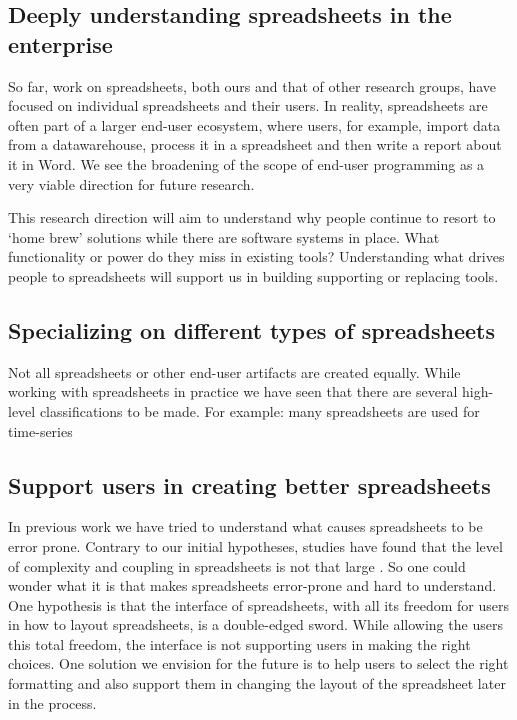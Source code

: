\documentclass[conference]{IEEEtran}
\begin{document}
\subsection{Deeply understanding spreadsheets in the enterprise}
So far, work on spreadsheets, both ours and that of other research groups, have focused on individual spreadsheets and their users. In reality, spreadsheets are often part of a larger end-user ecosystem, where users, for example, import data from a datawarehouse, process it in a spreadsheet and then write a report about it in Word. We see the broadening of the scope of end-user programming as a very viable direction for future research. 

This research direction will aim to understand why people continue to resort to `home brew' solutions while there are software systems in place. What functionality or power do they miss in existing tools? Understanding what drives people to spreadsheets will support us in building supporting or replacing tools.

\subsection{Specializing on different types of spreadsheets}
Not all spreadsheets or other end-user artifacts are created equally. While working with spreadsheets in practice we have seen that there are several high-level classifications to be made. For example: many spreadsheets are used for time-series 

\subsection{Support users in creating better spreadsheets}
In previous work we have tried to understand what causes spreadsheets to be error prone. Contrary to our initial hypotheses, studies have found that the level of complexity and coupling in spreadsheets is not that large . So one could wonder what it is that makes spreadsheets error-prone and hard to understand. One hypothesis is that the interface of spreadsheets, with all its freedom for users in how to layout spreadsheets, is a double-edged sword. While allowing the users this total freedom, the interface is not supporting users in making the right choices. One solution we envision for the future is to help users to select the right formatting and also support them in changing the layout of the spreadsheet later in the process. 
\end{document}
